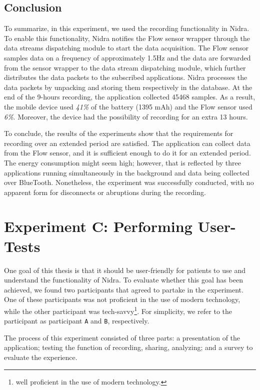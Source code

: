 \subsection{Conclusion}
To summarize, in this experiment, we used the recording functionality in Nidra. To enable this functionality, Nidra notifies the Flow sensor wrapper through the data streams dispatching module to start the data acquisition. The Flow sensor samples data on a frequency of approximately 1.5Hz and the data are forwarded from the sensor wrapper to the data stream dispatching module, which further distributes the data packets to the subscribed applications. Nidra processes the data packets by unpacking and storing them respectively in the database. At the end of the 9-hours recording, the application collected 45468 samples. As a result, the mobile device used \textit{41\%} of the battery (1395 mAh) and the Flow sensor used \textit{6\%}. Moreover, the device had the possibility of recording for an extra 13 hours.

To conclude, the results of the experiments show that the requirements for recording over an extended period are satisfied. The application can collect data from the Flow sensor, and it is sufficient enough to do it for an extended period. The energy consumption might seem high; however, that is reflected by three applications running simultaneously in the background and data being collected over BlueTooth. Nonetheless, the experiment was successfully conducted, with no apparent form for disconnects or abruptions during the recording. 

\section{Experiment C: Performing User-Tests}
One goal of this thesis is that it should be user-friendly for patients to use and understand the functionality of Nidra. To evaluate whether this goal has been achieved, we found two participants that agreed to partake in the experiment. One of these participants was not proficient in the use of modern technology, while the other participant was tech-savvy\footnote{well proficient in the use of modern technology.}. For simplicity, we refer to the participant as participant \verb|A| and \verb|B|, respectively. 

The process of this experiment consisted of three parts: a presentation of the application; testing the function of recording, sharing, analyzing; and a survey to evaluate the experience. 

